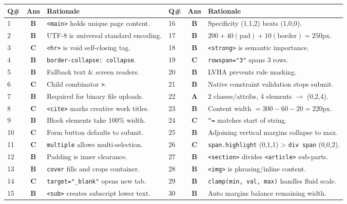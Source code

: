 \begin{center}
\begin{tabularx}{\textwidth}{l c X l c X}
\toprule
\textbf{Q\#} & \textbf{Ans} & \textbf{Rationale} & \textbf{Q\#} & \textbf{Ans} & \textbf{Rationale} \\
\midrule
1 & \textbf{B} & \texttt{<main>} holds unique page content. & 16 & \textbf{B} & Specificity (1,1,2) beats (1,0,0). \\
2 & \textbf{B} & UTF-8 is universal standard encoding. & 17 & \textbf{B} & $200 + 40(\text{pad}) + 10(\text{border}) = 250\text{px}$. \\
3 & \textbf{C} & \texttt{<hr>} is void self-closing tag. & 18 & \textbf{B} & \texttt{<strong>} is semantic importance. \\
4 & \textbf{B} & \texttt{border-collapse: collapse}. & 19 & \textbf{C} & \texttt{rowspan="3"} spans 3 rows. \\
5 & \textbf{B} & Fallback text \& screen readers. & 20 & \textbf{B} & LVHA prevents rule masking. \\
6 & \textbf{C} & Child combinator \texttt{>}. & 21 & \textbf{B} & Native constraint validation stops submit. \\
7 & \textbf{B} & Required for binary file uploads. & 22 & \textbf{A} & 2 classes/attribs, 4 elements $\to$ (0,2,4). \\
8 & \textbf{C} & \texttt{<cite>} marks creative work titles. & 23 & \textbf{B} & Content width $= 300 - 60 - 20 = 220\text{px}$. \\
9 & \textbf{B} & Block elements take 100\% width. & 24 & \textbf{C} & \texttt{\textasciicircum=} matches start of string. \\
10 & \textbf{C} & Form button defaults to submit. & 25 & \textbf{B} & Adjoining vertical margins collapse to max. \\
11 & \textbf{C} & \texttt{multiple} allows multi-selection. & 26 & \textbf{C} & \texttt{span.highlight} (0,1,1) > \texttt{div span} (0,0,2). \\
12 & \textbf{B} & Padding is inner clearance. & 27 & \textbf{B} & \texttt{<section>} divides \texttt{<article>} sub-parts. \\
13 & \textbf{B} & \texttt{cover} fills and crops container. & 28 & \textbf{B} & \texttt{<img>} is phrasing/inline content. \\
14 & \textbf{C} & \texttt{target="\_blank"} opens new tab. & 29 & \textbf{B} & \texttt{clamp(min, val, max)} handles fluid scale. \\
15 & \textbf{B} & \texttt{<sub>} creates subscript lower text. & 30 & \textbf{B} & Auto margins balance remaining width. \\
\bottomrule
\end{tabularx}
\end{center}
